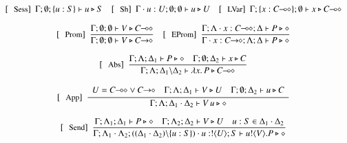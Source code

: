 \begin{figure}[!t]
\[
	\begin{array}{c}
		\trule{Sess}~~\Gamma; \emptyset; \set{u:S} \proves u \hastype S 
		\quad
		\trule{Sh}~~\Gamma \cat u : U; \emptyset; \emptyset \proves u \hastype U
		\quad
		\trule{LVar}~~\Gamma; \set{x: \lhot{C}}; \emptyset \proves x \hastype \lhot{C}
		\\[4mm]

		\trule{Prom}~~\tree{
			\Gamma; \emptyset; \emptyset \proves V \hastype \lhot{C}
		}{
			\Gamma; \emptyset; \emptyset \proves V \hastype \shot{C}
		} 
		\quad
		\trule{EProm}~~\tree{
			\Gamma; \Lambda \cat x : \lhot{C}; \Delta \proves P \hastype \Proc
		}{
			\Gamma \cat x:\shot{C}; \Lambda; \Delta \proves P \hastype \Proc
		}
		\\[6mm]
%
		\trule{Abs}~~\tree{
			\Gamma; \Lambda; \Delta_1 \proves P \hastype \Proc
			\quad
			\Gamma; \es; \Delta_2 \proves x \hastype C
		}{
			\Gamma; \Lambda; \Delta_1 \backslash \Delta_2 \proves \abs{x}{P} \hastype \lhot{C}
		}
		\\[6mm]

		\trule{App}~~\tree{
			\begin{array}{c}
				U = \lhot{C} \lor \shot{C}
				\quad
				\Gamma; \Lambda; \Delta_1 \proves V \hastype U
				\quad
				\Gamma; \es; \Delta_2 \proves u \hastype C
			\end{array}
		}{
			\Gamma; \Lambda; \Delta_1 \cat \Delta_2 \proves \appl{V}{u} \hastype \Proc
		} 
		\\[6mm]


		\trule{Send}~~\tree{
			\Gamma; \Lambda_1; \Delta_1 \proves P \hastype \Proc
			\quad
			\Gamma; \Lambda_2; \Delta_2 \proves V \hastype U
			\quad
			u:S \in \Delta_1 \cat \Delta_2
		}{
			\Gamma; \Lambda_1 \cat \Lambda_2; ((\Delta_1 \cat \Delta_2) \backslash \set{u:S}) 
			\cat u:\btout{U} S \proves \bout{u}{V} P \hastype \Proc
		}
		\\[6mm]


\end{array}\]
\end{figure}
